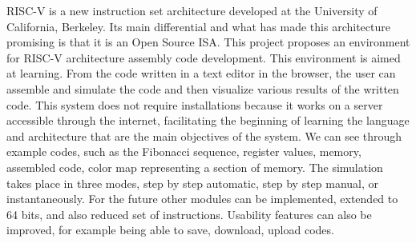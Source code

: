 RISC-V is a new instruction set architecture developed at the University of California, Berkeley. Its main differential and what has made this architecture promising is that it is an Open Source ISA. This project proposes an environment for RISC-V architecture assembly code development. This environment is aimed at learning. From the code written in a text editor in the browser, the user can assemble and simulate the code and then visualize various results of the written code. This system does not require installations because it works on a server accessible through the internet, facilitating the beginning of learning the language and architecture that are the main objectives of the system. We can see through example codes, such as the Fibonacci sequence, register values, memory, assembled code, color map representing a section of memory. The simulation takes place in three modes, step by step automatic, step by step manual, or instantaneously. For the future other modules can be implemented, extended to 64 bits, and also reduced set of instructions. Usability features can also be improved, for example being able to save, download, upload codes.
